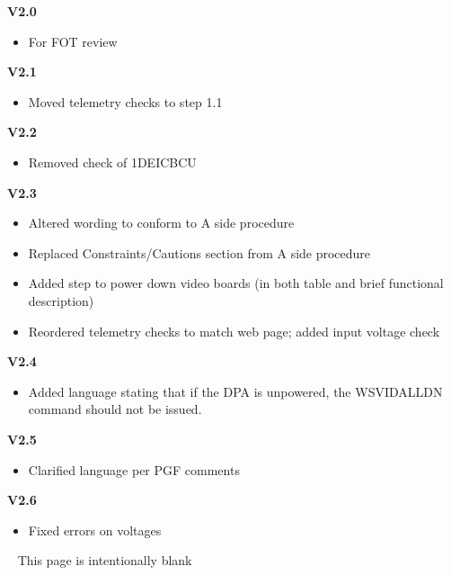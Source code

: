 \documentclass[11pt]{article}
\begin{document}
{\bf V2.0}
\begin{itemize}
\item For FOT review
\end{itemize}

{\bf V2.1}
\begin{itemize}
\item Moved telemetry checks to step 1.1
\end{itemize}

{\bf V2.2}
\begin{itemize}
\item Removed check of 1DEICBCU
\end{itemize}

{\bf V2.3}
\begin{itemize}
\item Altered wording to conform to A side procedure
\item Replaced Constraints/Cautions section from A side procedure
\item Added step to power down video boards (in both table and brief functional description)
\item Reordered telemetry checks to match web page; added input voltage check
\end{itemize}

{\bf V2.4}
\begin{itemize}
\item Added language stating that if the DPA is unpowered, the WSVIDALLDN command
should not be issued.
\end{itemize}

{\bf V2.5}
\begin{itemize}
\item Clarified language per PGF comments
\end{itemize}

{\bf V2.6}
\begin{itemize}
\item Fixed errors on voltages
\end{itemize}

\newpage\
\vspace{0.4\textheight}
\bc This page is intentionally blank \ec

\newcommand{\tablecaptiontext}{TURN OFF DEA B}

\end{document}
